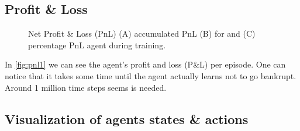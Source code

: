 \documentclass{kththesis}
\theoremstyle{definition}
\begin{document}
%		

\subsection*{Profit \& Loss}

\begin{figure}[H]
    \centering
    
    \caption{Net Profit \& Loss (PnL) (A) accumulated PnL (B) for and (C) percentage PnL agent during training.}
    \label{fig:pnl1}
\end{figure}
In \autoref{fig:pnl1} we can see the agent's profit and loss (P\&L) per episode. One can notice that it takes some time until the agent actually learns not to go bankrupt. Around 1 million time steps seems is needed.


%		

\subsection*{Visualization of agents states \& actions}
\end{document}
